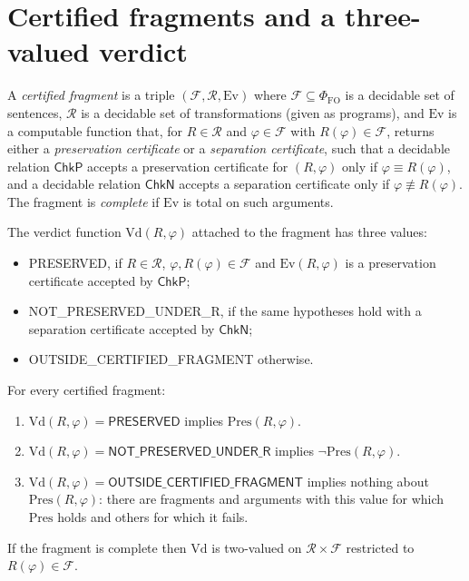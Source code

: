 \section{Certified fragments and a three-valued verdict}
\label{sec:fragments}

\begin{definition}
\label{def:fragment}
A \emph{certified fragment} is a triple $(\mathcal F,\mathcal R,\mathrm{Ev})$ where $\mathcal F\subseteq\Phi_{\mathrm{FO}}$ is a decidable set of sentences, $\mathcal R$ is a decidable set of transformations (given as programs), and $\mathrm{Ev}$ is a computable function that, for $R\in\mathcal R$ and $\varphi\in\mathcal F$ with $R(\varphi)\in\mathcal F$, returns either a \emph{preservation certificate} or a \emph{separation certificate}, such that a decidable relation $\mathsf{ChkP}$ accepts a preservation certificate for $(R,\varphi)$ only if $\varphi\equiv R(\varphi)$, and a decidable relation $\mathsf{ChkN}$ accepts a separation certificate only if $\varphi\not\equiv R(\varphi)$. The fragment is \emph{complete} if $\mathrm{Ev}$ is total on such arguments.
\end{definition}

The verdict function $\mathrm{Vd}(R,\varphi)$ attached to the fragment has three values:
\begin{itemize}[nosep]
\item \textsf{PRESERVED}, if $R\in\mathcal R$, $\varphi,R(\varphi)\in\mathcal F$ and $\mathrm{Ev}(R,\varphi)$ is a preservation certificate accepted by $\mathsf{ChkP}$;
\item \textsf{NOT\_PRESERVED\_UNDER\_R}, if the same hypotheses hold with a separation certificate accepted by $\mathsf{ChkN}$;
\item \textsf{OUTSIDE\_CERTIFIED\_FRAGMENT} otherwise.
\end{itemize}

\begin{theorem}
\label{thm:verdict}
For every certified fragment:
\begin{enumerate}[label=(\roman*),nosep]
\item $\mathrm{Vd}(R,\varphi)=\textsf{PRESERVED}$ implies $\mathrm{Pres}(R,\varphi)$.
\item $\mathrm{Vd}(R,\varphi)=\textsf{NOT\_PRESERVED\_UNDER\_R}$ implies $\neg\mathrm{Pres}(R,\varphi)$.
\item $\mathrm{Vd}(R,\varphi)=\textsf{OUTSIDE\_CERTIFIED\_FRAGMENT}$ implies nothing about $\mathrm{Pres}(R,\varphi)$: there are fragments and arguments with this value for which $\mathrm{Pres}$ holds and others for which it fails.
\end{enumerate}
If the fragment is complete then $\mathrm{Vd}$ is two-valued on $\mathcal R\times\mathcal F$ restricted to $R(\varphi)\in\mathcal F$.
\end{theorem}

